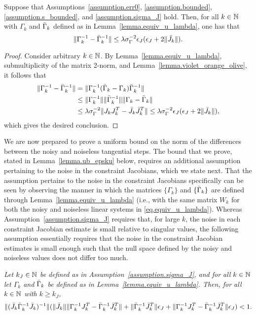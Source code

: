 \begin{lemma}\label{lemma.gamma_diff}
  Suppose that Assumptions~\ref{assumption.err0}, \ref{assumption.bounded}, \ref{assumption.s_bounded}, and \ref{assumption.sigma_J} hold.  Then, for all $k \in \mathbb{N}$ with $\Gamma_k$ and ${\bar \Gamma}_k$ defined as in Lemma~\ref{lemma.equiv_u_lambda}, one has that
  \begin{equation}\label{eq.gamma_diff}
    \| \Gamma_k^{-1} - {\bar \Gamma}_k^{-1} \| \leq \lambda \sigma_{\Gamma}^{-2} \epsilon_J (\epsilon_J + 2 \| {\bar J}_k\| ).
  \end{equation}
\end{lemma}
\begin{proof}
  Consider arbitrary $k \in \mathbb{N}$.  By Lemma~\ref{lemma.equiv_u_lambda}, submultiplicity of the matrix 2-norm, and Lemma~\ref{lemma.violet_orange_olive}, it follows that
  \begin{align*}
    \| \Gamma_k^{-1} - {\bar \Gamma}_k^{-1} \|
    &= \| \Gamma_k^{-1} ( {\bar \Gamma}_k - \Gamma_k ) {\bar \Gamma}_k^{-1} \| \\
    &\leq \| \Gamma_k^{-1} \| \| {\bar \Gamma}_k^{-1} \| \| \Gamma_k - {\bar \Gamma}_k \| \\
    &\leq \lambda \sigma_{\Gamma}^{-2} \|J_k J_k^T - {\bar J}_k {\bar J}_k^T\| \leq \lambda \sigma_{\Gamma}^{-2} \epsilon_J (\epsilon_J + 2 \| {\bar J}_k\| ),
  \end{align*}
  which gives the desired conclusion.
\end{proof}

We are now prepared to prove a uniform bound on the norm of the differences between the noisy and noiseless tangential steps.  The bound that we prove, stated in Lemma~\ref{lemma.ub_epsku} below, requires an additional assumption pertaining to the noise in the constraint Jacobians, which we state next.  That the assumption pertains to the noise in the constraint Jacobians specifically can be seen by observing the manner in which the matrices $\{\Gamma_k\}$ and $\{{\bar \Gamma}_k\}$ are defined through Lemma~\ref{lemma.equiv_u_lambda} (i.e., with the same matrix $W_k$ for both the noisy and noiseless linear systems in \eqref{eq.equiv_u_lambda}).  Whereas Assumption~\ref{assumption.sigma_J} requires that, for large $k$, the noise in each constraint Jacobian estimate is small relative to singular values, the following assumption essentially requires that the noise in the constraint Jacobian estimates is small enough such that the null space defined by the noisy and noiseless values does not differ too much.

\begin{assumption}\label{ass.noise_level}
  \textit{
  Let $k_J \in \mathbb{N}$ be defined as in Assumption~\ref{assumption.sigma_J}, and for all $k \in \mathbb{N}$ let $\Gamma_k$ and ${\bar \Gamma}_k$ be defined as in Lemma~\ref{lemma.equiv_u_lambda}.  Then, for all $k \in \mathbb{N}$ with $k \geq k_J$,
  \begin{multline*}
    \|({\bar J}_k {\bar \Gamma}_k^{-1} {\bar J}_k)^{-1}\| (\|{\bar J}_k\| \|\Gamma_k^{-1} J_k^T - {\bar \Gamma}_k^{-1} {\bar J}_k^T\| + \| {\bar \Gamma}_k^{-1} {\bar J}_k^T \| \epsilon_J + \| \Gamma_k^{-1} J_k^T - {\bar \Gamma}_k^{-1} {\bar J}_k^T \| \epsilon_J) < 1.
  \end{multline*}
  }
\end{assumption}

